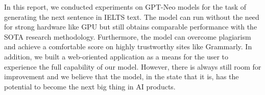 \documentclass[conference]{IEEEtran}
\begin{document}
    In this report, we conducted experiments on GPT-Neo models for the task of generating the next sentence in IELTS text. The model can run without the need for strong hardware like GPU but still obtains comparable performance with the SOTA research methodology. Furthermore, the model can overcome plagiarism and achieve a comfortable score on highly trustworthy sites like Grammarly.
    In addition, we built a web-oriented application as a means for the user to experience the full capability of our model. However, there is always still room for improvement and we believe that the model, in the state that it is, has the potential to become the next big thing in AI products.

    










\end{document}
